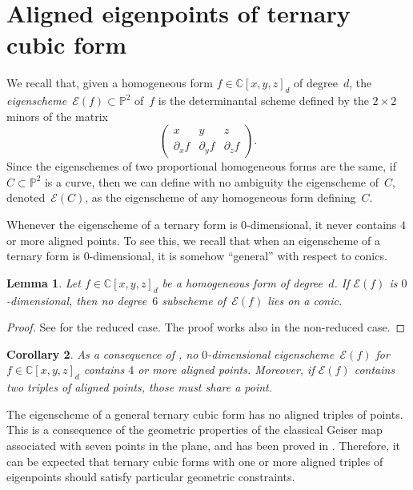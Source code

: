 \documentclass[a4paper, 11pt, reqno]{amsart}
\theoremstyle{plain}
\newtheorem{lemma}{Lemma}[section]
\newtheorem{corollary}[lemma]{Corollary}
\theoremstyle{definition}
\newcommand{\C}{\mathbb{C}}
\newcommand{\p}{\mathbb{P}}
\newcommand{\de}{\partial}
\newcommand{\Eig}[1]{\mathcal{E}\!\left( {#1} \right)}
\begin{document}
\section{Aligned eigenpoints of ternary cubic form}
\label{aligned}

We recall that, given a homogeneous form $f \in \C[x,y,z]_d$ of degree~$d$, the \emph{eigenscheme}~$\Eig{f} \subset \p^2$ of~$f$ is the determinantal scheme defined by the $2 \times 2$ minors of the matrix
%
\begin{equation}
\label{eq:def_matrix}
  \begin{pmatrix}
    x & y & z \\
    \de_x f & \de_y f & \de_z f
  \end{pmatrix}.
\end{equation}
%
Since the eigenschemes of two proportional homogeneous forms are the same,
if $C \subset \p^2$ is a curve, then we can define with no ambiguity the eigenscheme of~$C$, denoted~$\Eig{C}$, as the eigenscheme of any homogeneous form defining~$C$.

Whenever the eigenscheme of a ternary form is $0$-dimensional, it never contains $4$ or more aligned points.
To see this, we recall that when an eigenscheme of a ternary form is  $0$-dimensional, it is somehow ``general'' with respect to conics.

\begin{lemma}
\label{lemma:no_six_conic}
Let $f \in \C[x,y,z]_d$ be a homogeneous form of degree~$d$.
If $\Eig{f}$ is $0$-dimensional,
then no degree~$6$ subscheme of~$\Eig{f}$ lies on a conic.
\end{lemma}
\begin{proof}
See \cite[Lemma~9.1]{OS1} for the reduced case.
The proof works also in the non-reduced case.
\end{proof}

\begin{corollary}
\label{corollary:general_no_triple}
As a consequence of ,
no $0$-dimensional eigenscheme~$\Eig{f}$ for $f \in \C[x,y,z]_d$ contains $4$ or more aligned points.
Moreover, if $\Eig{f}$ contains two triples of aligned points, those must share a point.
\end{corollary}

The eigenscheme of a general ternary cubic form has no aligned triples of points. 
This is a consequence of the geometric properties of the classical Geiser map
associated with seven points in the plane, and has been proved in \cite[Proposition~4.5]{BGV}.
Therefore, it can be expected that ternary cubic forms with one or more aligned triples of eigenpoints should satisfy particular geometric constraints.
\end{document}
